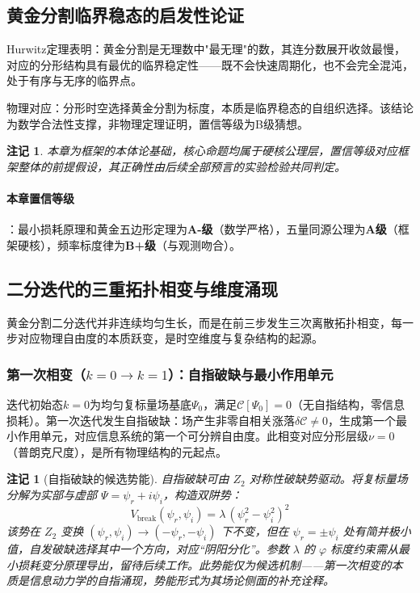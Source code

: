 \documentclass[12pt,a4paper,twocolumn]{article}
\renewcommand{\phi}{\varphi}
\newtheorem{remark}[theorem]{注记}
\begin{document}
\subsection{黄金分割临界稳态的启发性论证}
Hurwitz定理表明：黄金分割是无理数中"最无理"的数，其连分数展开收敛最慢，对应的分形结构具有最优的临界稳定性——既不会快速周期化，也不会完全混沌，处于有序与无序的临界点。

物理对应：分形时空选择黄金分割为标度，本质是临界稳态的自组织选择。该结论为数学合法性支撑，非物理定理证明，置信等级为B级猜想。

\begin{remark}
本章为框架的本体论基础，核心命题均属于硬核公理层，置信等级对应框架整体的前提假设，其正确性由后续全部预言的实验检验共同判定。
\end{remark}

\paragraph{本章置信等级}：最小损耗原理和黄金五边形定理为\textbf{A-级}（数学严格），五量同源公理为\textbf{A级}（框架硬核），频率标度律为\textbf{B+级}（与观测吻合）。


\subsection{二分迭代的三重拓扑相变与维度涌现}
\label{subsec:three_phase_transitions}
黄金分割二分迭代并非连续均匀生长，而是在前三步发生三次离散拓扑相变，每一步对应物理自由度的本质跃变，是时空维度与复杂结构的起源。

\subsubsection{第一次相变（$k=0\to k=1$）：自指破缺与最小作用单元}
迭代初始态$k=0$为均匀复标量场基底$\Psi_0$，满足$\mathcal{C}[\Psi_0]=0$（无自指结构，零信息损耗）。第一次迭代发生自指破缺：场产生非零自相关涨落$\delta\mathcal{C}\neq0$，生成第一个最小作用单元，对应信息系统的第一个可分辨自由度。此相变对应分形层级$\nu=0$（普朗克尺度），是所有物理结构的元起点。

\begin{remark}[自指破缺的候选势能]
\label{rmk:z2_breaking}
自指破缺可由 $Z_2$ 对称性破缺势驱动。将复标量场分解为实部与虚部 $\Psi = \psi_r + i\psi_i$，构造双阱势：
\begin{equation}
V_{\text{break}}(\psi_r, \psi_i) = \lambda\,(\psi_r^2 - \psi_i^2)^2
\end{equation}
该势在 $Z_2$ 变换 $(\psi_r, \psi_i) \to (-\psi_r, -\psi_i)$ 下不变，但在 $\psi_r = \pm\psi_i$ 处有简并极小值，自发破缺选择其中一个方向，对应``阴阳分化''。参数 $\lambda$ 的 $\phi$ 标度约束需从最小损耗变分原理导出，留待后续工作。此势能仅为候选机制——第一次相变的本质是信息动力学的自指涌现，势能形式为其场论侧面的补充诠释。
\end{remark}
\end{document}

